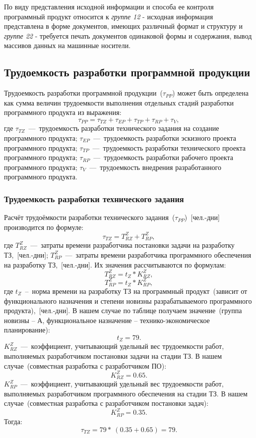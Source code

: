     По виду представления исходной информации и способа ее контроля программный продукт относится к \textit{группе 12} - исходная информация представлена в форме документов, имеющих различный формат и структуру и \textit{группе 22} - требуется печать документов одинаковой формы и содержания, вывод массивов данных на машинные носители.



    \subsection{Трудоемкость разработки программной продукции}
    \label{subsec:trud}
        Трудоемкость разработки программной продукции~($\tau_{PP}$) может быть определена как сумма величин трудоемкости выполнения отдельных стадий разработки программного продукта из выражения:
        $$\tau_{PP} = \tau_{TZ} + \tau_{EP} + \tau_{TP} + \tau_{RP} + \tau_{V},$$
        где $\tau_{TZ}$~---~трудоемкость разработки технического задания на создание программного продукта;
        $\tau_{EP}$~---~трудоемкость разработки эскизного проекта программного продукта;
        $\tau_{TP}$~---~трудоемкость разработки технического проекта программного продукта;
        $\tau_{RP}$~---~трудоемкость разработки рабочего проекта программного продукта;
        $\tau_{V}$~---~трудоемкость внедрения разработанного программного продукта.

        \subsubsection{Трудоемкость разработки технического задания}
            Расчёт трудоёмкости разработки технического задания~($\tau_{PP}$)~[чел.-дни] производится по формуле:
            $$\tau_{TZ} = T^Z_{RZ} + T^Z_{RP},$$
            где $T^Z_{RZ}$~---~затраты времени разработчика постановки задачи на разработку ТЗ,~[чел.-дни];
            $T^Z_{RP}$~---~затраты времени разработчика программного обеспечения на разработку ТЗ,~[чел.-дни].
            Их значения рассчитываются по формулам:
            $$T^Z_{RZ} = t_Z * K^Z_{RZ},$$
            $$T^Z_{RP} = t_Z * K^Z_{RP},$$
            где $t_Z$~--~норма времени на разработку ТЗ на программный продукт~(зависит от функционального назначения и степени новизны разрабатываемого программного продукта),~[чел.-дни].
            В нашем случае по таблице получаем значение~(группа новизны – А, функциональное назначение – технико-экономическое планирование):
            $$t_Z = 79.$$
            $K^Z_{RZ}$~---~коэффициент, учитывающий удельный вес трудоемкости работ, выполняемых разработчиком постановки задачи на стадии ТЗ.
            В нашем случае~(совместная разработка с разработчиком ПО):
            $$K^Z_{RZ} = 0.65.$$
            $K^Z_{RP}$~---~коэффициент, учитывающий удельный вес трудоемкости работ, выполняемых разработчиком программного обеспечения на стадии ТЗ.
            В нашем случае~(совместная разработка с разработчиком постановки задач):
            $$K^Z_{RP} = 0.35.$$
            Тогда:
            $$\tau_{TZ} = 79 *~(0.35 + 0.65) = 79.$$

